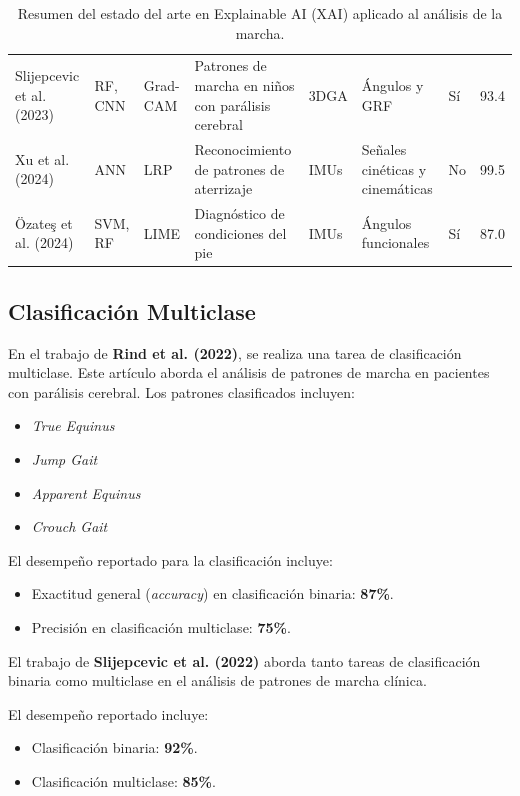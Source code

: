 \documentclass{report}
\begin{document}
\begin{table}[ht]
\begin{tabular}{@{}p{1.5cm}p{2cm}p{1.5cm}p{3cm}p{2cm}p{2.5cm}p{1.5cm}p{2.5cm}}
    Slijepcevic et al. (2023) & RF, CNN & Grad-CAM & Patrones de marcha en niños con parálisis cerebral & 3DGA & Ángulos y GRF & Sí & 93.4 \\
    Xu et al. (2024) & ANN & LRP & Reconocimiento de patrones de aterrizaje & IMUs & Señales cinéticas y cinemáticas & No & 99.5 \\
    Özateş et al. (2024) & SVM, RF & LIME & Diagnóstico de condiciones del pie & IMUs & Ángulos funcionales & Sí & 87.0 \\
    \bottomrule
    \end{tabular}
    \caption{Resumen del estado del arte en Explainable AI (XAI) aplicado al análisis de la marcha.}
    \label{tab:state_of_art}
    \end{table}

    \subsection{Clasificación Multiclase}
    En el trabajo de \textbf{Rind et al. (2022)}, se realiza una tarea de clasificación multiclase. Este artículo aborda el análisis de patrones de marcha en pacientes con parálisis cerebral. Los patrones clasificados incluyen:
    
    \begin{itemize}
        \item \textit{True Equinus}
        \item \textit{Jump Gait}
        \item \textit{Apparent Equinus}
        \item \textit{Crouch Gait}
    \end{itemize}
    
    El desempeño reportado para la clasificación incluye:
    \begin{itemize}
        \item Exactitud general (\textit{accuracy}) en clasificación binaria: \textbf{87\%}.
        \item Precisión en clasificación multiclase: \textbf{75\%}.
    \end{itemize}
    
    
    El trabajo de \textbf{Slijepcevic et al. (2022)} aborda tanto tareas de clasificación binaria como multiclase en el análisis de patrones de marcha clínica. 
    
    El desempeño reportado incluye:
    
    \begin{itemize}
        \item Clasificación binaria: \textbf{92\%}.
        \item Clasificación multiclase: \textbf{85\%}.
    \end{itemize}
    
\end{document}
